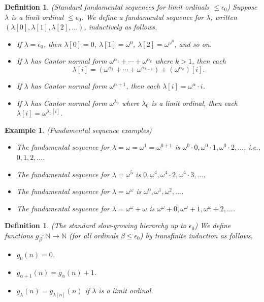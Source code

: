 \documentclass{article}
\newtheorem{definition}[theorem]{Definition}
\newtheorem{example}[theorem]{Example}
\begin{document}
\begin{definition}
    (Standard fundamental sequences for limit ordinals $\leq\epsilon_0$)
    Suppose $\lambda$ is a limit ordinal $\leq\epsilon_0$. We define a
    \emph{fundamental sequence for $\lambda$},
    written $(\lambda[0],\lambda[1],\lambda[2],\ldots)$, inductively as follows.
    \begin{itemize}
        \item
        If $\lambda=\epsilon_0$, then $\lambda[0]=0$,
        $\lambda[1]=\omega^0$, $\lambda[2]=\omega^{\omega^0}$, and so on.
        \item
        If $\lambda$ has Cantor normal form
        $\omega^{\alpha_1}+\cdots+\omega^{\alpha_k}$ where $k>1$,
        then
        each
        \[
            \lambda[i] = (\omega^{\alpha_1}+\cdots+\omega^{\alpha_{k-1}})
            + (\omega^{\alpha_k})[i].
        \]
        \item
        If $\lambda$ has Cantor normal form $\omega^{\alpha+1}$,
        then each $\lambda[i]=\omega^{\alpha}\cdot i$.
        \item
        If $\lambda$ has Cantor normal form $\omega^{\lambda_0}$ where $\lambda_0$
        is a limit ordinal, then each $\lambda[i]=\omega^{\lambda_0[i]}$.
    \end{itemize}
\end{definition}

\begin{example}
    (Fundamental sequence examples)
    \begin{itemize}
        \item
        The fundamental sequence for $\lambda=\omega=\omega^1=\omega^{0+1}$ is
        $\omega^0\cdot 0, \omega^0\cdot 1, \omega^0\cdot 2, \ldots$,
        i.e., $0, 1, 2, \ldots$.
        \item
        The fundamental sequence for $\lambda=\omega^5$ is
        $0,\omega^4,\omega^4\cdot 2,\omega^4\cdot 3,\ldots$.
        \item
        The fundamental sequence for $\lambda=\omega^\omega$ is
        $\omega^0,\omega^1,\omega^2,\ldots$.
        \item
        The fundamental sequence for $\lambda=\omega^\omega+\omega$ is
        $\omega^\omega+0,\omega^\omega+1,\omega^\omega+2,\ldots$.
    \end{itemize}
\end{example}

\begin{definition}
\label{slowgrowinghierarchydefn}
    (The standard slow-growing hierarchy up to $\epsilon_0$)
    We define functions $g_\beta:\mathbb N\to\mathbb N$ (for all ordinals
    $\beta\leq \epsilon_0$) by transfinite induction as follows.
    \begin{itemize}
        \item
        $g_0(n)=0$.
        \item
        $g_{\alpha+1}(n) = g_\alpha(n) + 1$.
        \item
        $g_{\lambda}(n) = g_{\lambda[n]}(n)$ if $\lambda$ is a limit ordinal.
    \end{itemize}
\end{definition}
\end{document}

